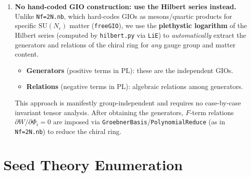 \documentclass[12pt]{article}
\begin{document}
\begin{enumerate}[label=\textbf{1.\arabic*}]
\item \textbf{No hand-coded GIO construction: use the Hilbert series instead.} \\
  Unlike \texttt{Nf=2N.nb}, which hard-codes GIOs as mesons/quartic products for specific
  $\mathrm{SU}(N_c)$ matter (\texttt{freeGIO}), we use the \textbf{plethystic logarithm}
  of the Hilbert series (computed by \texttt{hilbert.py} via \texttt{LiE}) to
  \emph{automatically} extract the generators and relations of the chiral ring for
  \emph{any} gauge group and matter content.
  \begin{itemize}
    \item \textbf{Generators} (positive terms in PL): these are the independent GIOs.
    \item \textbf{Relations} (negative terms in PL): algebraic relations among generators.
  \end{itemize}
  This approach is manifestly group-independent and requires no case-by-case invariant tensor analysis.
  After obtaining the generators, $F$-term relations $\partial W/\partial \Phi_i = 0$ are imposed
  via \texttt{GroebnerBasis}/\texttt{PolynomialReduce} (as in \texttt{Nf=2N.nb}) to reduce the chiral ring.

\end{enumerate}

\section{Seed Theory Enumeration}
\end{document}
